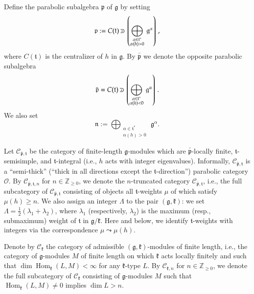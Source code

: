 \documentclass{tglat2e}
\theoremstyle{definition}
\theoremstyle{remark}
\renewcommand{\tt}{\mathfrak{t}}
\newcommand{\kk}{\mathfrak{k}}
\newcommand{\nn}{\mathfrak{n}}
\newcommand{\pp}{\mathfrak{p}}
\renewcommand{\gg}{\mathfrak{g}}
\DeclareMathOperator{\Hom}{Hom}
\def\crplus{\hbox{$\supset${\raise1.15pt\hbox{\kern -0.55em ${\scriptscriptstyle +}$}}\ }}
\begin{document}
Define the parabolic subalgebra $\mathfrak{p}$ of $\mathfrak{g}$ by setting 
\begin{equation*}
	\mathfrak{p}:=C(\mathfrak{t})\,\crplus\,\left(\bigoplus_{\substack{{\alpha\in\mathfrak{t}^*}\\{\alpha(h)>0}}}\,\gg^\alpha\right)\,,
\end{equation*}
where $C(\mathfrak{t})$ is the centralizer of $h$ in $\mathfrak g$. By $\bar{\pp}$ we denote the opposite parabolic subalgebra
\begin{equation*}
	\bar{\mathfrak{p}}=C(\mathfrak{t})\,\crplus\,\left(\bigoplus_{\substack{{\alpha\in\mathfrak{t}^*}\\{\alpha(h)<0}}}\,\gg^\alpha\right)\,.
\end{equation*}
 We also set
$$\nn:=\bigoplus_{\substack{{\alpha\in\mathfrak{t}^*}\\{\alpha(h)>0}}}\,\gg^\alpha.$$

Let $\mathcal{C}_{\bar{\pp},\tt}$ be the category of finite-length $\gg$-modules which are $\bar{\pp}$-locally finite, $\tt$-semisimple, and $\tt$-integral (i.e., $h$ acts with integer eigenvalues).  Informally, $\mathcal{C}_{\bar{\pp},\tt}$ is a ``semi-thick'' (``thick in all directions except the $\tt$-direction'') parabolic category $\mathcal{O}$.  By $\mathcal{C}_{\bar{\pp},\tt,n}$ for $n\in\mathbb{Z}_{\geq 0}$, we denote the $n$-truncated category $\mathcal{C}_{\bar{\pp},\tt}$, i.e., the full subcategory of $\mathcal{C}_{\bar{\pp},\tt}$ consisting of objects all $\tt$-weights $\mu$ of which satisfy $\mu(h)\geq n$.  We also assign an integer $\Lambda$ to the pair $(\gg,\kk)$: we set $\Lambda=\frac{1}{2}\left(\lambda_1+\lambda_2\right)$, where $\lambda_1$ (respectively, $\lambda_2$) is the maximum (resp., submaximum) weight of $\tt$ in $\gg/\kk$.  Here and below, we identify $\tt$-weights with integers via the correspondence $\mu \leadsto \mu(h)$.

Denote by $\mathcal{C}_\kk$ the category of admissible $(\gg,\kk)$-modules of finite length, i.e., the category of $\gg$-modules $M$ of finite length on which $\kk$ acts locally finitely and such that $\dim\Hom_\kk(L,M)<\infty$ for any $\kk$-type $L$.  By $\mathcal{C}_{\kk,n}$ for $n\in\mathbb{Z}_{\geq 0}$, we denote the full subcategory of $\mathcal{C}_\kk$ consisting of $\gg$-modules $M$ such that $\Hom_\kk(L,M)\neq 0$ implies $\dim L>n$.
\end{document}
